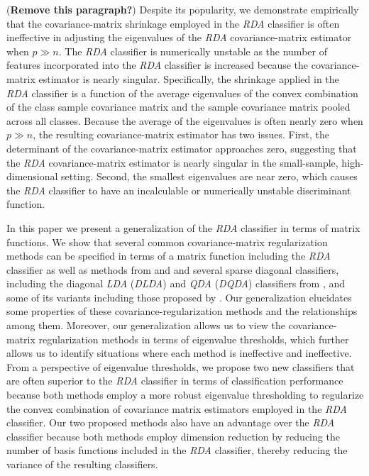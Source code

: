 \documentclass[11pt]{article}
\begin{document}
(\textbf{Remove this paragraph?})
Despite its popularity, we demonstrate empirically that the covariance-matrix shrinkage employed in the \emph{RDA} classifier is often ineffective in adjusting the eigenvalues of the \emph{RDA} covariance-matrix estimator when $p \gg n$. The \emph{RDA} classifier is numerically unstable as the number of features incorporated into the \emph{RDA} classifier is increased because the covariance-matrix estimator is nearly singular. Specifically, the shrinkage applied in the \emph{RDA} classifier is a function of the average eigenvalues of the convex combination of the class sample covariance matrix and the sample covariance matrix pooled across all classes. Because the average of the eigenvalues is often nearly zero when $p \gg n$, the resulting covariance-matrix estimator has two issues. First, the determinant of the covariance-matrix estimator approaches zero, suggesting that the \emph{RDA} covariance-matrix estimator is nearly singular in the small-sample, high-dimensional setting. Second, the smallest eigenvalues are near zero, which causes the \emph{RDA} classifier to have an incalculable or numerically unstable discriminant function.

In this paper we present a generalization of the \emph{RDA} classifier in terms of matrix functions. We show that several common covariance-matrix regularization methods can be specified in terms of a matrix function including the \emph{RDA} classifier as well as methods from \cite{Srivastava:2007ww} and \cite*{Thomaz:2006ef} and several sparse diagonal classifiers, including the diagonal \emph{LDA} (\emph{DLDA}) and \emph{QDA} (\emph{DQDA}) classifiers from \cite{Dudoit:2002ev}, and some of its variants including those proposed by \cite{Pang:2009ik}.  Our generalization elucidates some properties of these covariance-regularization methods and the relationships among them. Moreover, our generalization allows us to view the covariance-matrix regularization methods in terms of eigenvalue thresholds, which further allows us to identify situations where each method is ineffective and ineffective. From a perspective of eigenvalue thresholds, we propose two new classifiers that are often superior to the \emph{RDA} classifier in terms of classification performance because both methods employ a more robust eigenvalue thresholding to regularize the convex combination of covariance matrix estimators employed in the \emph{RDA} classifier. Our two proposed methods also have an advantage over the \emph{RDA} classifier because both methods employ dimension reduction by reducing the number of basis functions included in the \emph{RDA} classifier, thereby reducing the variance of the resulting classifiers.
\end{document}
